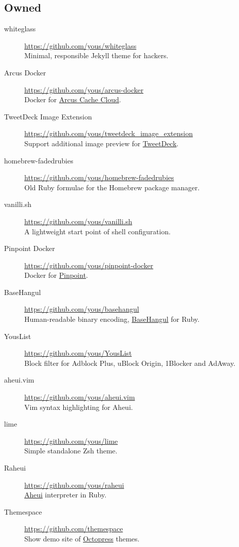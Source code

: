 \documentclass[a4paper,10pt]{article}
\begin{document}
\subsection{Owned}
\begin{description}
  \item[whiteglass] \url{https://github.com/yous/whiteglass} \\
    Minimal, responsible Jekyll theme for hackers.
  \item[Arcus Docker] \url{https://github.com/yous/arcus-docker} \\
    Docker for \href{https://github.com/naver/arcus}{Arcus Cache Cloud}.
  \item[TweetDeck Image Extension] \url{https://github.com/yous/tweetdeck_image_extension} \\
    Support additional image preview for \href{https://tweetdeck.twitter.com}{TweetDeck}.
  \item[homebrew-fadedrubies] \url{https://github.com/yous/homebrew-fadedrubies} \\
    Old Ruby formulae for the Homebrew package manager.
  \item[vanilli.sh] \url{https://github.com/yous/vanilli.sh} \\
    A lightweight start point of shell configuration.
  \item[Pinpoint Docker] \url{https://github.com/yous/pinpoint-docker} \\
    Docker for \href{https://github.com/naver/pinpoint}{Pinpoint}.
  \item[BaseHangul] \url{https://github.com/yous/basehangul} \\
    Human-readable binary encoding, \href{https://basehangul.github.io}{BaseHangul} for Ruby.
  \item[YousList] \url{https://github.com/yous/YousList} \\
    Block filter for Adblock Plus, uBlock Origin, 1Blocker and AdAway.
  \item[aheui.vim] \url{https://github.com/yous/aheui.vim} \\
    Vim syntax highlighting for Aheui.
  \item[lime] \url{https://github.com/yous/lime} \\
    Simple standalone Zsh theme.
  \item[Raheui] \url{https://github.com/yous/raheui} \\
    \href{http://aheui.github.io}{Aheui} interpreter in Ruby.
  \item[Themespace] \url{https://github.com/themespace} \\
    Show demo site of \href{http://octopress.org}{Octopress} themes.
\end{description}
\end{document}
